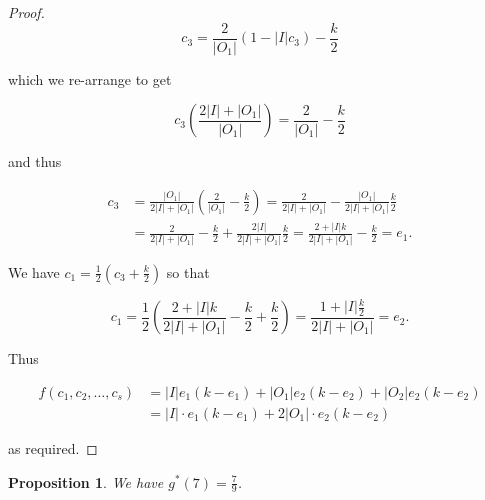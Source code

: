 \documentclass{article}
\newtheorem{proposition}{Proposition}
\begin{document}
\begin{proof}
$$c_3 = \frac{2}{|O_1|}(1-|I|c_3)-\frac{k}{2}$$

\noindent
which we re-arrange to get 

$$c_3(\frac{2|I|+|O_1|}{|O_1|}) = \frac{2}{|O_1|} - \frac{k}{2}$$

\noindent
and thus 

\begin{align*}
c_3 &= \frac{|O_1|}{2|I|+|O_1|} (\frac{2}{|O_1|} - \frac{k}{2}) = \frac{2}{2|I|+|O_1|} - \frac{|O_1|}{2|I|+|O_1|}\frac{k}{2} \\
&=  \frac{2}{2|I|+|O_1|} - \frac{k}{2} + \frac{2|I|}{2|I|+|O_1|}\frac{k}{2} = \frac{2+|I|k}{2|I|+|O_1|} - \frac{k}{2} = e_1.
\end{align*}

We have $c_1 = \frac{1}{2}(c_3 + \frac{k}{2})$ so that

$$c_1 = \frac{1}{2}( \frac{2+|I|k}{2|I|+|O_1|} - \frac{k}{2} + \frac{k}{2}) =  \frac{1+|I|\frac{k}{2}}{2|I|+|O_1|} = e_2.$$

Thus

\begin{align*}
f(c_1,c_2,\ldots,c_s) &= |I|e_1(k-e_1) + |O_1|e_2(k-e_2) + |O_2|e_2(k-e_2) \\
&= |I| \cdot e_1(k-e_1) + 2|O_1| \cdot e_2(k-e_2) 
\end{align*}

\noindent
as required. 
\end{proof}

\begin{proposition}
We have $g^*(7) = \frac{7}{9}$.
\end{proposition}
\end{document}
